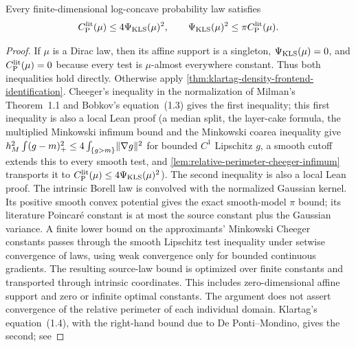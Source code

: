 \begin{theorem}
  \label{thm:logconcave-cheeger-poincare-comparison}
  \leanok
  Every finite-dimensional log-concave probability law satisfies
  \[
    C_{\mathrm P}^{\mathrm{lit}}(\mu)\le4\Psi_{\mathrm{KLS}}(\mu)^2,
    \qquad
    \Psi_{\mathrm{KLS}}(\mu)^2\le\pi C_{\mathrm P}^{\mathrm{lit}}(\mu).
  \]
\end{theorem}
\begin{proof}
  \leanok
  If $\mu$ is a Dirac law, then its affine support is a singleton, $\Psi_{\mathrm{KLS}}(\mu)=0$, and
  $C_{\mathrm P}^{\mathrm{lit}}(\mu)=0$ because every test is $\mu$-almost everywhere constant.  Thus both inequalities
  hold directly.  Otherwise apply \cref{thm:klartag-density-frontend-identification}.  Cheeger's
  inequality in the normalization of Milman's Theorem~1.1 and Bobkov's equation~(1.3) gives the
  first inequality; this first inequality is also a local Lean proof
  (a median split, the layer-cake
  formula, the multiplied Minkowski infimum bound and the Minkowski coarea inequality give
  $h_M^2\int(g-m)_+^2\le4\int_{\{g>m\}}\lVert\nabla g\rVert^2$ for bounded $C^1$ Lipschitz $g$, a
  smooth cutoff extends this to every smooth test, and \cref{lem:relative-perimeter-cheeger-infimum}
  transports it to $C_{\mathrm P}^{\mathrm{lit}}(\mu)\le4\Psi_{\mathrm{KLS}}(\mu)^2$). The second inequality is also a
  local Lean proof. The intrinsic Borell law is convolved with the normalized
  Gaussian kernel. Its positive smooth convex potential gives the exact smooth-model $\pi$ bound;
  its literature Poincaré constant is at most the source constant plus the Gaussian variance.
  A finite lower bound on the approximants' Minkowski Cheeger constants passes through the
  smooth Lipschitz test inequality under setwise convergence of laws, using weak convergence
  only for bounded continuous gradients. The resulting source-law bound is optimized over
  finite constants and transported through intrinsic coordinates. This includes zero-dimensional
  affine support and zero or infinite optimal constants. The argument does not assert
  convergence of the relative perimeter of each individual domain.
  Klartag's equation~(1.4), with the right-hand bound due to
  De Ponti--Mondino, gives the second; see

\end{proof}
